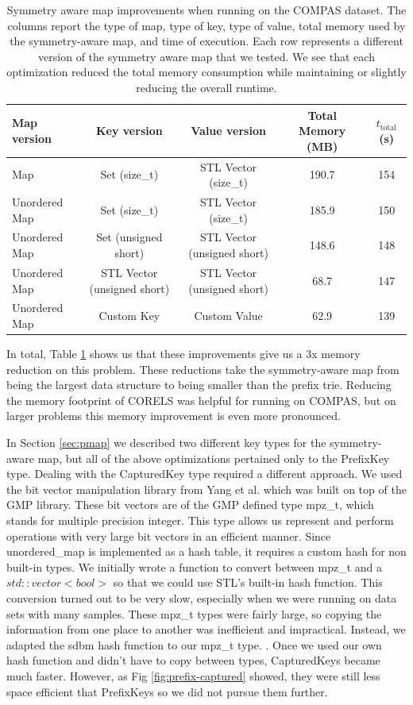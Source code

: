 \begin{table}[t!]
\begin{tabular}{l | c | c | c | c }
Map version & Key version & Value version & Total Memory (MB) & $t_\text{total}$ (s)\\
\hline
Map & Set (size\_t) & STL Vector (size\_t) & 190.7 & 154 \\
Unordered Map & Set (size\_t) & STL Vector (size\_t) & 185.9 & 150 \\
Unordered Map & Set  (unsigned short) & STL Vector (unsigned short) & 148.6 & 148 \\
Unordered Map & STL Vector (unsigned short) & STL Vector (unsigned short) & 68.7 & 147 \\
Unordered Map & Custom Key & Custom Value & 62.9 & 139 \\
\end{tabular}
\vspace{4mm}
\caption{Symmetry aware map improvements when running on the COMPAS dataset.
%
The columns report the type of map,
type of key, type of value,
total memory used by the symmetry-aware map, and time of execution.
%
Each row represents a different version of the symmetry aware map that we tested.
We see that each optimization reduced the total memory consumption while maintaining or slightly reducing the overall runtime.
}
\label{tab:pmap}
\end{table}

In total, Table \ref{tab:pmap} shows us that these improvements give us a 3x memory reduction on this problem.
These reductions take the symmetry-aware map from being the largest data structure to being smaller than the prefix trie.
Reducing the memory footprint of CORELS was helpful for running on COMPAS, but on larger problems this memory improvement is even more pronounced.

In Section \ref{sec:pmap} we described two different key types for the symmetry-aware map, but all of the above optimizations pertained only to the PrefixKey type.
Dealing with the CapturedKey type required a different approach.
We used the bit vector manipulation library from Yang et al. \cite{YangRuSe16} which was built on top of the GMP library.
These bit vectors are of the GMP defined type mpz\_t, which stands for multiple precision integer.
This type allows us represent and perform operations with very large bit vectors in an efficient manner.
Since unordered\_map is implemented as a hash table, it requires a custom hash for non built-in types.
We initially wrote a function to convert between mpz\_t and a $std::vector<bool>$ so that we could use STL's built-in hash function.
This conversion turned out to be very slow, especially when we were running on data sets with many samples.
These mpz\_t types were fairly large, so copying the information from one place to another was inefficient and impractical.
Instead, we adapted the sdbm hash function to our mpz\_t type. \cite{HashFunctions}.
Once we used our own hash function and didn't have to copy between types, CapturedKeys became much faster.
However, as Fig \ref{fig:prefix-captured} showed, they were still less space efficient that PrefixKeys so we did not pursue them further.

